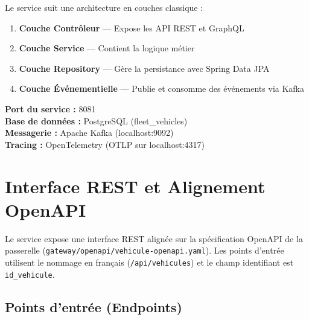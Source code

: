 \documentclass[12pt,a4paper]{report}
\begin{document}
Le service suit une architecture en couches classique :

\begin{enumerate}
    \item \textbf{Couche Contr\^oleur} --- Expose les API REST et GraphQL
    \item \textbf{Couche Service} --- Contient la logique m\'etier
    \item \textbf{Couche Repository} --- G\`ere la persistance avec Spring Data JPA
    \item \textbf{Couche \'Ev\'enementielle} --- Publie et consomme des \'ev\'enements via Kafka
\end{enumerate}

\begin{infobox}
\textbf{Port du service :} 8081 \\
\textbf{Base de donn\'ees :} PostgreSQL (fleet\_vehicles) \\
\textbf{Messagerie :} Apache Kafka (localhost:9092) \\
\textbf{Tracing :} OpenTelemetry (OTLP sur localhost:4317)
\end{infobox}

\chapter{Interface REST et Alignement OpenAPI}

Le service expose une interface REST align\'ee sur la sp\'ecification OpenAPI de la passerelle (\texttt{gateway/openapi/vehicule-openapi.yaml}). Les points d'entr\'ee utilisent le nommage en fran\c{c}ais (\texttt{/api/vehicules}) et le champ identifiant est \texttt{id\_vehicule}.

\section{Points d'entr\'ee (Endpoints)}
\end{document}
